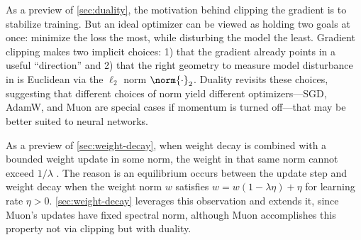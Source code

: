 
\begin{notebox}
    As a preview of \cref{sec:duality}, the motivation behind clipping the gradient is to stabilize training. But an ideal optimizer can be viewed as holding two goals at once: minimize the loss the most, while disturbing the model the least. Gradient clipping makes two implicit choices: 1) that the gradient already points in a useful ``direction'' and 2) that the right geometry to measure model disturbance in is Euclidean via the $\ell_2$ norm $\norm{\cdot}_2$. Duality revisits these choices, suggesting that different choices of norm yield different optimizers---SGD, AdamW, and Muon are special cases if momentum is turned off---that may be better suited to neural networks.
\end{notebox}

\begin{notebox}
    As a preview of \cref{sec:weight-decay}, when weight decay is combined with a bounded weight update in some norm, the weight in that same norm cannot exceed $1/\lambda$ \citep{pethick2025trainingdeeplearningmodels}. The reason is an equilibrium occurs between the update step and weight decay when the weight norm $w$ satisfies $w = w(1 - \lambda \eta) + \eta$ for learning rate $\eta > 0$. \cref{sec:weight-decay} leverages this observation and extends it, since Muon's updates have fixed spectral norm, although Muon accomplishes this property not via clipping but with duality.
\end{notebox}



